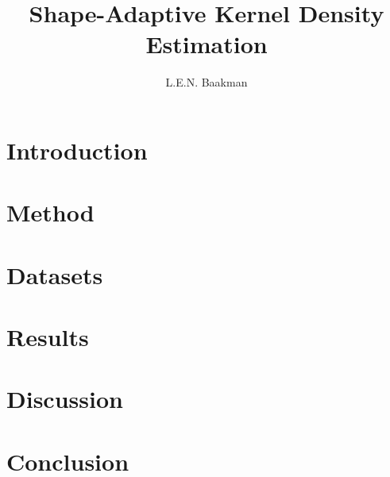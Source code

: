 \documentclass[10pt, a4paper, twocolumn]{article}
\title{Shape-Adaptive Kernel Density Estimation}
\author{L.E.N. Baakman}
\begin{document}
\maketitle



\section{Introduction}
\label{s:introduction}


\section{Method}
\label{s:method}


\section{Datasets}
\label{s:datasets}


\section{Results}
\label{s:results}


\section{Discussion}
\label{s:discussion}


\section{Conclusion}
\label{s:conclusion}

	
\printbibliography
\end{document}
